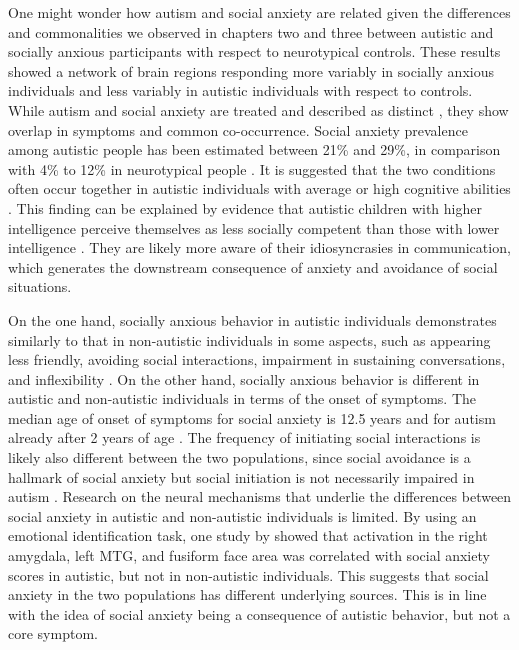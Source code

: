 One might wonder how autism and social anxiety are related given the differences and commonalities we observed in chapters two and three between autistic and socially anxious participants with respect to neurotypical controls. These results showed a network of brain regions responding more variably in socially anxious individuals and less variably in autistic individuals with respect to controls. While autism and social anxiety are treated and described as distinct \citep{apa2013}, they show overlap in symptoms and common co-occurrence. Social anxiety prevalence among autistic people has been estimated between 21\% and 29\%, in comparison with 4\% to 12\% in neurotypical people \citep{muris1998,simonoff2008,kessler2005,stein2017}. It is suggested that the two conditions often occur together in autistic individuals with average or high cognitive abilities \citep{bellini2004,kuusikko2008}. This finding can be explained by evidence that autistic children with higher intelligence perceive themselves as less socially competent than those with lower intelligence \citep{capps1995}. They are likely more aware of their idiosyncrasies in communication, which generates the downstream consequence of anxiety and avoidance of social situations.

On the one hand, socially anxious behavior in autistic individuals demonstrates similarly to that in non-autistic individuals in some aspects, such as appearing less friendly, avoiding social interactions, impairment in sustaining conversations, and inflexibility \citep{white2011socialanxiety}. On the other hand, socially anxious behavior is different in autistic and non-autistic individuals in terms of the onset of symptoms. The median age of onset of symptoms for social anxiety is 12.5 years and for autism already after 2 years of age \citep{dewit1999,ozonoff2008}. The frequency of initiating social interactions is likely also different between the two populations, since social avoidance is a hallmark of social anxiety but social initiation is not necessarily impaired in autism \citep{white2011socialanxiety,humphreys2011}. Research on the neural mechanisms that underlie the differences between social anxiety in autistic and non-autistic individuals is limited. By using an emotional identification task, one study by \cite{kleinhans2010} showed that activation in the right amygdala, left MTG, and fusiform face area was correlated with social anxiety scores in autistic, but not in non-autistic individuals. This suggests that social anxiety in the two populations has different underlying sources. This is in line with the idea of social anxiety being a consequence of autistic behavior, but not a core symptom.

